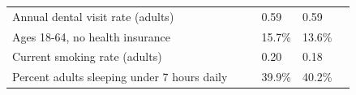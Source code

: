\documentclass[9pt]{report}
\begin{document}
\begin{tabular}{p{.10in}p{.10in}p{.10in}p{3.7in}>{\hfill}p{.85in}>{\hfill}p{.85in}>{\hfill}p{.85in}>{\hfill}p{.85in}p{0.1in}}
\multicolumn{4}{l}{\parbox{3.6in}{\strut\raggedright{{Annual dental visit rate (adults)}}\strut}} &  &  & 0.59 & 0.59 & \multicolumn{1}{l}{}  \\ 
\multicolumn{4}{l}{\parbox{3.6in}{\strut\raggedright{{Ages 18-64, no health insurance}}\strut}} &  &  & 15.7\% & 13.6\% & \multicolumn{1}{l}{}  \\ 
\multicolumn{4}{l}{\parbox{3.6in}{\strut\raggedright{{Current smoking rate (adults)}}\strut}} &  &  & 0.20 & 0.18 & \multicolumn{1}{l}{}  \\ 
\multicolumn{4}{l}{\parbox{3.6in}{\strut\raggedright{{Percent adults sleeping under 7 hours daily}}\strut}} &  &  & 39.9\% & 40.2\% & \multicolumn{1}{l}{}  \\ 

\end{tabular}
\setlength{\tabcolsep}{6pt} %


\vspace{36pt}
\linespread{1.5}
\theendnotes
\end{document}
